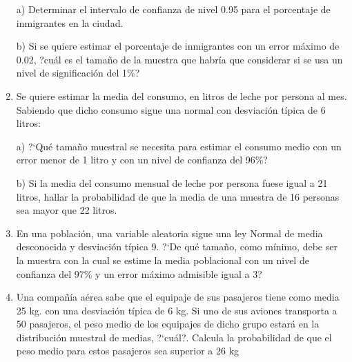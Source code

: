 \begin{adjustwidth}{20pt}{10pt}
\begin{enumerate}[PB. 1. ]
a) Determinar el intervalo de confianza de nivel 0.95 para el porcentaje de inmigrantes en la ciudad.

b) Si se quiere estimar el porcentaje de inmigrantes con un error máximo de 0.02, ?cuál es el tamaño de la muestra que habría que considerar si se usa un nivel de significación del 1\%? 
		
		\hspace{-1cm}\vspace{1cm}
		
		
	\item 	Se quiere estimar la media del consumo, en litros de leche por persona al mes. Sabiendo que dicho consumo sigue una normal con desviación típica de 6 litros:
	
a) ?`Qué tamaño muestral se necesita para estimar el consumo medio con un error menor de 1 litro y con un nivel de confianza del 96\%?

b) Si la media del consumo mensual de leche por persona fuese igual a 21 litros, hallar la probabilidad de que la media de una muestra de 16 personas sea mayor que 22 litros.
		
		\hspace{-1cm}\vspace{1cm}
		
	\item 	En una población, una variable aleatoria sigue una ley Normal de media desconocida y desviación típica 9. ?`De qué tamaño, como mínimo, debe ser la muestra con la cual se estime la media poblacional con un nivel de confianza del 97\% y un error máximo admisible igual a 3?
		
		\hspace{-1cm}\vspace{1cm}
		
	\item 	Una compañía aérea sabe que el equipaje de sus pasajeros tiene como media 25 kg. con una desviación típica de 6 kg. Si uno de sus aviones transporta a 50 pasajeros, el peso medio de los equipajes de dicho grupo estará en la distribución muestral de medias, ?`cuál?. Calcula la probabilidad de que el peso medio para estos pasajeros sea superior a 26 kg
		
		\hspace{-1cm}\vspace{1cm}
		

\end{enumerate}
\end{adjustwidth}
